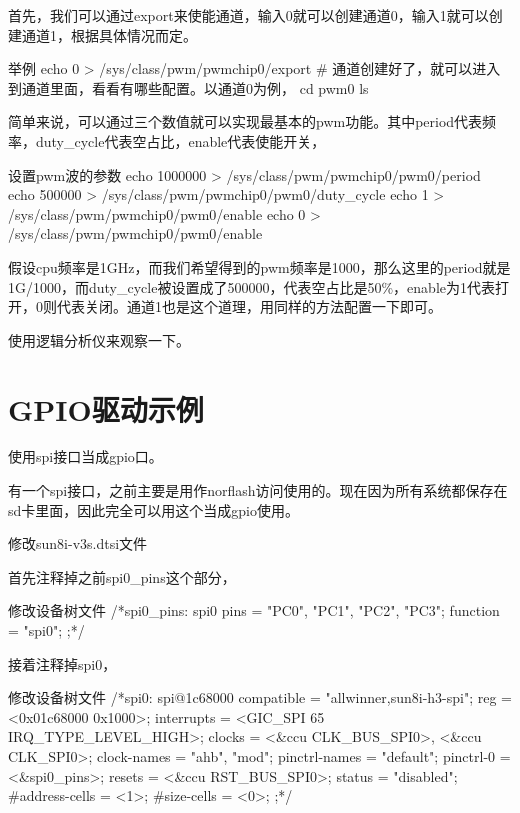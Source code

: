 \documentclass[lang=cn,newtx,10pt,scheme=chinese]{elegantbook}
\begin{document}
首先，我们可以通过export来使能通道，输入0就可以创建通道0，输入1就可以创建通道1，根据具体情况而定。

\begin{mycode}{举例}
echo 0 > /sys/class/pwm/pwmchip0/export
# 通道创建好了，就可以进入到通道里面，看看有哪些配置。以通道0为例，
cd pwm0
ls
\end{mycode}

简单来说，可以通过三个数值就可以实现最基本的pwm功能。其中period代表频率，duty\_cycle代表空占比，enable代表使能开关，

\begin{mycode}{设置pwm波的参数}
echo 1000000 > /sys/class/pwm/pwmchip0/pwm0/period
echo 500000 > /sys/class/pwm/pwmchip0/pwm0/duty_cycle
echo 1 > /sys/class/pwm/pwmchip0/pwm0/enable
echo 0 > /sys/class/pwm/pwmchip0/pwm0/enable
\end{mycode}

假设cpu频率是1GHz，而我们希望得到的pwm频率是1000，那么这里的period就是1G/1000，而duty\_cycle被设置成了500000，代表空占比是50\%，enable为1代表打开，0则代表关闭。通道1也是这个道理，用同样的方法配置一下即可。

使用逻辑分析仪来观察一下。

\chapter{GPIO驱动示例}

使用spi接口当成gpio口。

有一个spi接口，之前主要是用作norflash访问使用的。现在因为所有系统都保存在sd卡里面，因此完全可以用这个当成gpio使用。

修改sun8i-v3s.dtsi文件

首先注释掉之前spi0\_pins这个部分，

\begin{mycode}{修改设备树文件}
/*spi0_pins: spi0 {
    pins = "PC0", "PC1", "PC2", "PC3";
    function = "spi0";
};*/
\end{mycode}

接着注释掉spi0，

\begin{mycode}{修改设备树文件}
/*spi0: spi@1c68000 {
    compatible = "allwinner,sun8i-h3-spi";
    reg = <0x01c68000 0x1000>;
    interrupts = <GIC_SPI 65 IRQ_TYPE_LEVEL_HIGH>;
    clocks = <&ccu CLK_BUS_SPI0>, <&ccu CLK_SPI0>;
    clock-names = "ahb", "mod";
    pinctrl-names = "default";
    pinctrl-0 = <&spi0_pins>;
    resets = <&ccu RST_BUS_SPI0>;
    status = "disabled";
    #address-cells = <1>;
    #size-cells = <0>;
};*/
\end{mycode}
\end{document}
